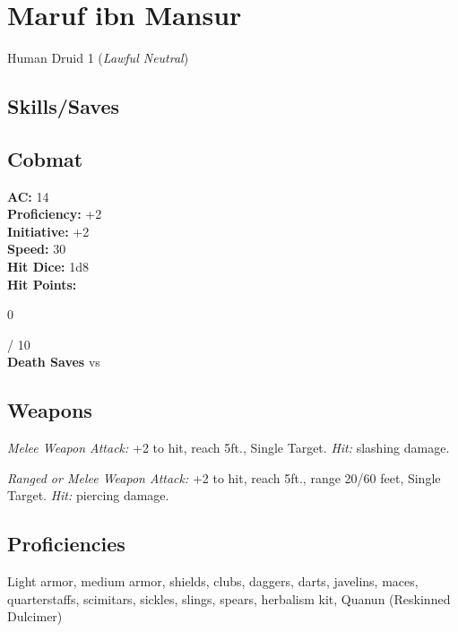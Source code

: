 \documentclass[letterpaper,10pt,twoside,twocolumn,openany]{book}
\begin{document}
\section{Maruf ibn Mansur}

Human Druid 1 (\textit{Lawful Neutral})

\subsection{Skills/Saves}
\saves[
    STR=\stat{9},
    DEX=\stat{15},
    CON=\stat{16},
    INT=\stat{10},
    WIS=\stat{16},
    CHA=\stat{10},
    NATURE=1,
    SURVIVAL=1,
    INSIGHT=1,
    PERCEPTION=1,
]

\subsection{Cobmat}
\begingroup
  \unskip\color{titlered}
  \textbf{AC:} 14\\
  \textbf{Proficiency:} +2\\
  \textbf{Initiative:} +2 \\
  \textbf{Speed:} 30 \\
  \textbf{Hit Dice:} 1d8 \Circle \\
	\textbf{Hit Points:} \parbox[l][1em][c]{1em}{0} / 10 \\
  \textbf{Death Saves} \Circle \Circle \Circle vs \Circle \Circle \Circle
\endgroup

\subsection{Weapons}
\begingroup
  \begin{monsteraction}[Scimitar]
    \textit{Melee Weapon Attack:} +2 to hit, reach 5ft., Single Target. \textit{Hit:}  slashing damage.
  \end{monsteraction}

  \begin{monsteraction}[Dagger]
    \textit{Ranged or Melee Weapon Attack:} +2 to hit, reach 5ft., range 20/60 feet, Single Target. \textit{Hit:}  piercing damage.
  \end{monsteraction}
\endgroup%

\subsection{Proficiencies}
Light armor, medium armor, shields, clubs, daggers, darts, javelins, maces, quarterstaffs, scimitars, sickles, slings, spears, herbalism kit, Quanun (Reskinned Dulcimer)
\end{document}
